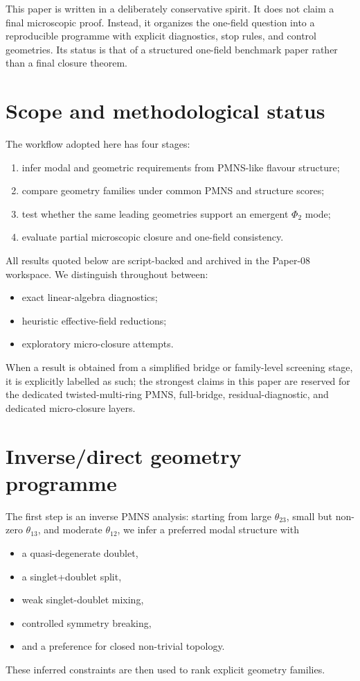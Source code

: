 \documentclass[aps,prd,onecolumn,nofootinbib,superscriptaddress]{revtex4-2}
\begin{document}
This paper is written in a deliberately conservative spirit.
It does not claim a final microscopic proof.
Instead, it organizes the one-field question into a reproducible programme with explicit diagnostics, stop rules, and control geometries.
Its status is that of a structured one-field benchmark paper rather than a final closure theorem.

\section{Scope and methodological status}
The workflow adopted here has four stages:
\begin{enumerate}[label=\arabic*)]
  \item infer modal and geometric requirements from PMNS-like flavour structure;
  \item compare geometry families under common PMNS and structure scores;
  \item test whether the same leading geometries support an emergent $\Phi_2$ mode;
  \item evaluate partial microscopic closure and one-field consistency.
\end{enumerate}
All results quoted below are script-backed and archived in the Paper-08 workspace.
We distinguish throughout between:
\begin{itemize}
  \item exact linear-algebra diagnostics;
  \item heuristic effective-field reductions;
  \item exploratory micro-closure attempts.
\end{itemize}
When a result is obtained from a simplified bridge or family-level screening stage, it is explicitly labelled as such; the strongest claims in this paper are reserved for the dedicated twisted-multi-ring PMNS, full-bridge, residual-diagnostic, and dedicated micro-closure layers.

\section{Inverse/direct geometry programme}
The first step is an inverse PMNS analysis:
starting from large $\theta_{23}$, small but non-zero $\theta_{13}$, and moderate $\theta_{12}$, we infer a preferred modal structure with
\begin{itemize}
  \item a quasi-degenerate doublet,
  \item a singlet+doublet split,
  \item weak singlet-doublet mixing,
  \item controlled symmetry breaking,
  \item and a preference for closed non-trivial topology.
\end{itemize}
These inferred constraints are then used to rank explicit geometry families.
\end{document}
